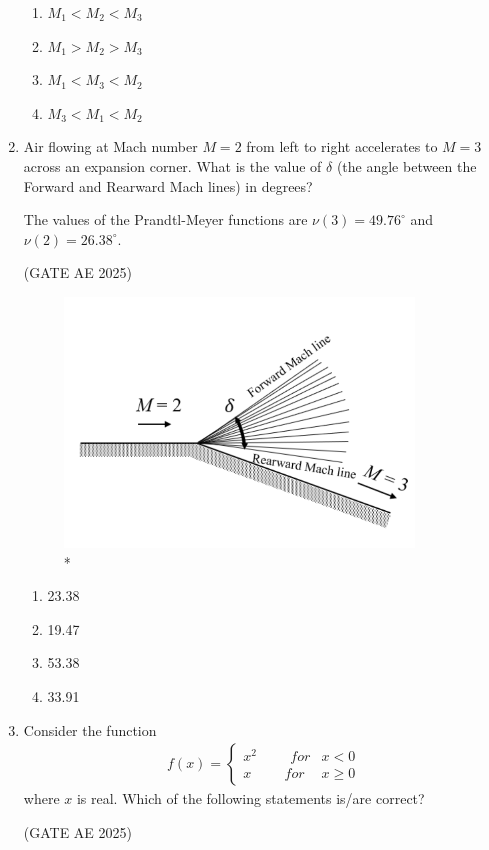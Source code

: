 \documentclass[journal,12pt,onecolumn]{IEEEtran}
\theoremstyle{remark}
\begin{document}
\begin{flushleft}
\begin{enumerate}
\begin{enumerate}
\item $M_1 < M_2 < M_3$  
\item $M_1 > M_2 > M_3$  
\item $M_1 < M_3 < M_2$  
\item $M_3 < M_1 < M_2$  
\end{enumerate}

\item Air flowing at Mach number $M = 2$ from left to right accelerates to $M = 3$ across an expansion corner. What is the value of $\delta$ (the angle between the Forward and Rearward Mach lines) in degrees? 

The values of the Prandtl-Meyer functions are $\nu(3) = 49.76^\circ$ and $\nu(2) = 26.38^\circ$. 

\hfill (GATE AE 2025)

\begin{figure}
\includegraphics[width=0.5\columnwidth]{figs/44.png}
\caption{*}
    \label{fig:placeholder}
\end{figure}

\begin{enumerate}
\item 23.38  
\item 19.47  
\item 53.38  
\item 33.91
\end{enumerate}  

\item Consider the function  
\begin{align*}
f(x) =
\begin{cases}
x^2 \hspace{1cm} for & x < 0 \\
x \hspace{1cm} for & x \ge 0
\end{cases}
\end{align*}
where $x$ is real. Which of the following statements is/are correct?  

\hfill (GATE AE 2025)


\end{enumerate}
\end{flushleft}
\end{document}
